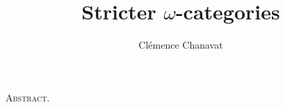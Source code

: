 \documentclass[11pt,twoside]{article}
\title{Stricter $\omega$-categories}
\author{Cl\'emence Chanavat}
\begin{document}
\maketitle
\begin{center}
	\begin{minipage}[t]{.95\textwidth}
		\small\textsc{Abstract.}

	\end{minipage}
	
	\vspace{20pt}

	\begin{minipage}[t]{0.95\textwidth}
		\setcounter{tocdepth}{2}
		\tableofcontents
	\end{minipage}
\end{center}

\makeaftertitle







\small
\end{document}
